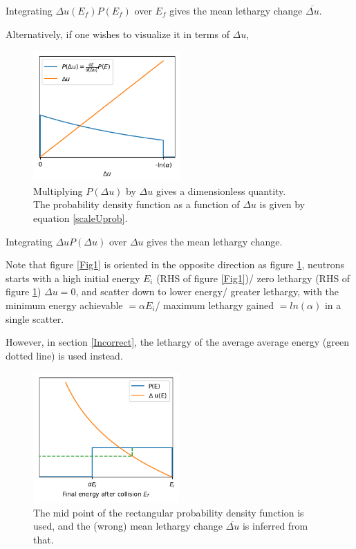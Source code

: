 \documentclass[a4paper, 12pt]{article}
\begin{document}
	Integrating $\Delta u(E_f) P(E_f)$ over $E_f$ gives the mean lethargy change $\overline{\Delta u}$.
	
	Alternatively, if one wishes to visualize it in terms of $\Delta u$,
	
	\begin{figure}[H]
	\centering
	\includegraphics[height=5cm]{Fig2.png}
	\caption{Multiplying $P(\Delta u)$ by $\Delta u$ gives a dimensionless quantity. \\
	The probability density function as a function of $\Delta u$ is given by equation \ref{scaleUprob}.	}\label{Fig2}
	\end{figure}	

	Integrating $\Delta u P(\Delta u)$ over $\Delta u$ gives the mean lethargy change.


	Note that figure \ref{Fig1} is oriented in the opposite direction as figure \ref{Fig2}, neutrons starts with a high initial energy $E_i$ (RHS of figure \ref{Fig1})/ zero lethargy (RHS of figure \ref{Fig2}) $\Delta u=0$, and scatter down to lower energy/ greater lethargy, with the minimum energy achievable $= \alpha E_i$/ maximum lethargy gained $= ln(\alpha)$ in a single scatter.

	
	However, in section \ref{Incorrect}, the lethargy of the average average energy (green dotted line) is used instead.

	\begin{figure}[H]
	\centering
	\includegraphics[height=5cm]{Fig3.png}
	\caption{The mid point of the rectangular probability density function is used, and the (wrong) mean lethargy change $\overline{\Delta u}$ is inferred from that.}\label{Fig3}
	\end{figure}		
\end{document}

